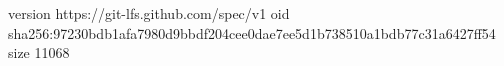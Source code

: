version https://git-lfs.github.com/spec/v1
oid sha256:97230bdb1afa7980d9bbdf204cee0dae7ee5d1b738510a1bdb77c31a6427ff54
size 11068
